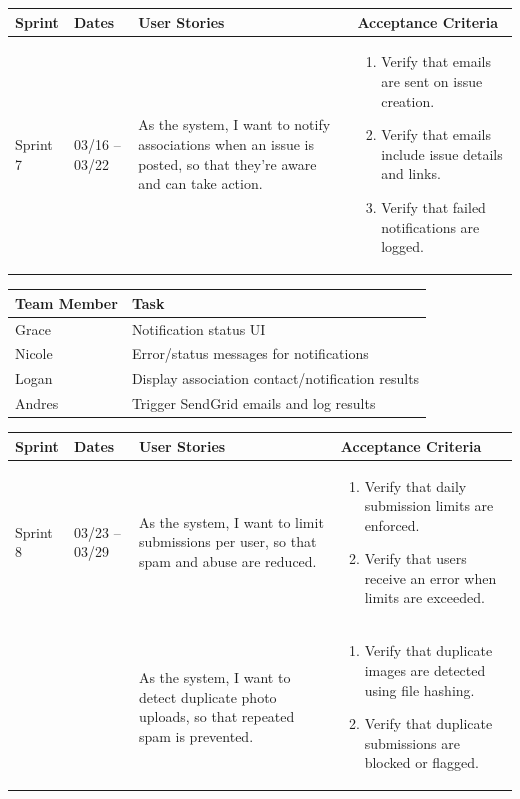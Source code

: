 \documentclass[11pt]{article}
\begin{document}
\noindent
\begin{tabular}{|L{1.2cm}|L{1.8cm}|L{5.2cm}|L{6.3cm}|}
\hline
\textbf{Sprint} & \textbf{Dates} & \textbf{User Stories} & \textbf{Acceptance Criteria} \\
\hline
Sprint 7 & 03/16 -- 03/22 &
As the system, I want to notify associations when an issue is posted, so that they're aware and can take action. &
\begin{enumerate}
    \item Verify that emails are sent on issue creation.
    \item Verify that emails include issue details and links.
    \item Verify that failed notifications are logged.
\end{enumerate} \\
\hline
\end{tabular}

\vspace{0.5em}

\noindent
\begin{tabular}{|L{2.5cm}|L{12.5cm}|}
\hline
\textbf{Team Member} & \textbf{Task} \\
\hline
Grace & Notification status UI \\
\hline
Nicole & Error/status messages for notifications \\
\hline
Logan & Display association contact/notification results \\
\hline
Andres & Trigger SendGrid emails and log results \\
\hline
\end{tabular}

\vspace{2em}


\vspace{0.5em}

\noindent
\begin{tabular}{|L{1.2cm}|L{1.8cm}|L{5.2cm}|L{6.3cm}|}
\hline
\textbf{Sprint} & \textbf{Dates} & \textbf{User Stories} & \textbf{Acceptance Criteria} \\
\hline
Sprint 8 & 03/23 -- 03/29 &
As the system, I want to limit submissions per user, so that spam and abuse are reduced. &
\begin{enumerate}
    \item Verify that daily submission limits are enforced.
    \item Verify that users receive an error when limits are exceeded.
\end{enumerate} \\
& &
As the system, I want to detect duplicate photo uploads, so that repeated spam is prevented. &
\begin{enumerate}
    \item Verify that duplicate images are detected using file hashing.
    \item Verify that duplicate submissions are blocked or flagged.
\end{enumerate} \\
\hline
\end{tabular}
\end{document}
